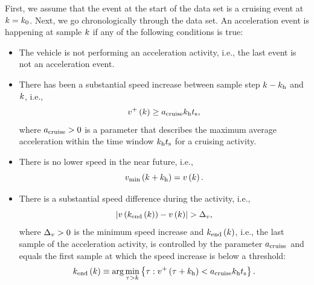 First, we assume that the event at the start of the data set is a cruising event at $k=k_{0}$. 
Next, we go chronologically through the data set. 
An acceleration event is happening at sample $k$ if any of the following conditions is true:
\begin{itemize}
	\item The vehicle is not performing an acceleration activity, i.e., the last event is not an acceleration event.
	\item \cstarta There has been a substantial speed increase between sample step $k-k_{\mathrm{h}}$ and $k$, i.e., 
	\begin{equation}
		\label{eq:start acceleration}
		v^{+}\left(k\right) \geq a_\mathrm{cruise}k_{\mathrm{h}}t_\mathrm{s},
	\end{equation} \cenda
	where $a_\mathrm{cruise}>0$ is a parameter \cstartf that describes the maximum average acceleration within the time window $k_{\mathrm{h}}t_\mathrm{s}$ for a cruising activity. \cendf
	\item There is no lower speed in the near future, i.e.,
	\begin{equation}
		\label{eq:acceleration condition}
		v_\mathrm{min}\left(k+k_{\mathrm{h}}\right)=v\left(k\right).
	\end{equation}
	\item There is a substantial speed difference during the activity, i.e., 
	\begin{equation}
		\label{eq:end acceleration condition}
		\left|v\left(k_{\mathrm{end}}\left(k\right)\right) - v\left(k\right)\right| > \Delta_{v},
	\end{equation}
	where \cstartc $\Delta_{v}>0$ is the minimum speed increase and \cendc $k_{\mathrm{end}}\left(k\right)$, \cstartf i.e., the last sample of the acceleration activity, \cendf is controlled by the parameter $a_\mathrm{cruise}$ and \cstarta equals the first sample at which the speed increase is below a threshold\cenda:
	\begin{equation}
		\label{eq:end acceleration}
		k_{\mathrm{end}}\left(k\right) \equiv \arg \min_{\tau > k} \left\{ \tau: v^{+}\left(\tau+k_{\mathrm{h}}\right) < a_\mathrm{cruise}k_{\mathrm{h}}t_\mathrm{s} \right\}.
	\end{equation}
\end{itemize}

